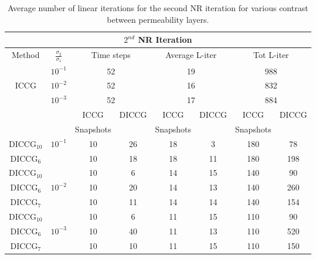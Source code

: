 \documentclass[12pt]{article}
\begin{document}
\begin{table}[!ht]\centering
\begin{minipage}{1\textwidth}
\vspace{-10pt}
\centering
\begin{tabular}{ |c|c|c|c|c|c|c|c|} 
  \hline
 \multicolumn{8}{|c|}{$2^{nd}$ NR Iteration}  \\
\hline
Method& $\frac{\sigma_2}{\sigma_1}$ & \multicolumn{2}{|c|}{Time steps} &\multicolumn{2}{|c|}{Average L-iter} & \multicolumn{2}{|c|}{Tot L-iter}\\
\hline
&$10^{-1}$ &\multicolumn{2}{|c|}{52} & \multicolumn{2}{|c|}{19}& \multicolumn{2}{|c|}{988} \\
ICCG&$10^{-2}$ & \multicolumn{2}{|c|}{52}& \multicolumn{2}{|c|}{16}& \multicolumn{2}{|c|}{832}\\
&$10^{-3}$ & \multicolumn{2}{|c|}{52} &\multicolumn{2}{|c|}{17} & \multicolumn{2}{|c|}{884}\\
\hline
&&ICCG&DICCG&ICCG&DICCG&ICCG&DICCG\\
&&Snapshots&&Snapshots&&Snapshots&\\
\hline
DICCG$_{10}$&$10^{-1}$ &10&26 &18&3 &180&78 \\
DICCG$_6$& &10&18 &18&11 &180&198 \\
\hline
DICCG$_{10}$& &10&6 & 14&15& 140&90\\
DICCG$_6$&$10^{-2}$ &10&20 & 14&13& 140&260\\
DICCG$_7$&&10&11 & 14&14& 140&154\\
\hline
DICCG$_{10}$& & 10&6 & 11&15&110&90 \\
DICCG$_6$&$10^{-3}$ & 10&40 & 11&13&110&520 \\
DICCG$_7$& & 10&10 & 11&15&110&150 \\
 \hline
 \end{tabular}
\caption{Average number of linear iterations for the second NR iteration for various contrast between permeability layers. }\label{table:liter2}
\end{minipage}
\end{table}
\end{document}
